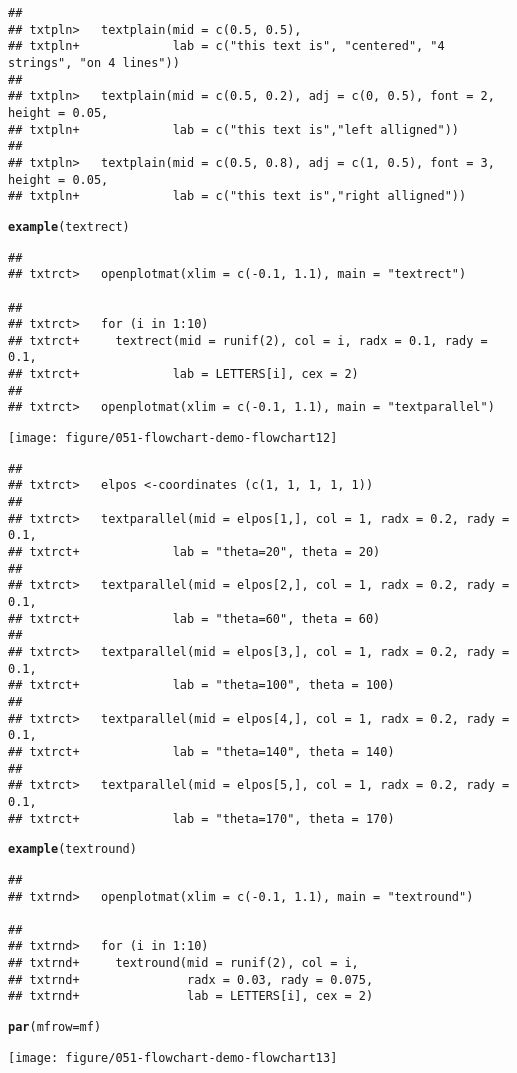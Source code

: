 \documentclass{article}\usepackage[]{graphicx}\usepackage[]{color}
\makeatletter
\def\maxwidth{ %
  \ifdim\Gin@nat@width>\linewidth
    \linewidth
  \else
    \Gin@nat@width
  \fi
}
\newcommand{\hlfunctioncall}[1]{\textcolor[rgb]{0.501960784313725,0,0.329411764705882}{\textbf{#1}}}%
\newenvironment{kframe}{%
 \def\at@end@of@kframe{}%
 \ifinner\ifhmode%
  \def\at@end@of@kframe{\end{minipage}}%
  \begin{minipage}{\columnwidth}%
 \fi\fi%
 \def\FrameCommand##1{\hskip\@totalleftmargin \hskip-\fboxsep
 \colorbox{shadecolor}{##1}\hskip-\fboxsep
     \hskip-\linewidth \hskip-\@totalleftmargin \hskip\columnwidth}%
 \MakeFramed {\advance\hsize-\width
   \@totalleftmargin\z@ \linewidth\hsize
   \@setminipage}}%
 {\par\unskip\endMakeFramed%
 \at@end@of@kframe}
\newenvironment{knitrout}{}{} %
\makeatother
\begin{document}
\begin{knitrout}
\begin{kframe}
\begin{verbatim}
## 
## txtpln>   textplain(mid = c(0.5, 0.5), 
## txtpln+             lab = c("this text is", "centered", "4 strings", "on 4 lines"))
## 
## txtpln>   textplain(mid = c(0.5, 0.2), adj = c(0, 0.5), font = 2, height = 0.05,
## txtpln+             lab = c("this text is","left alligned"))
## 
## txtpln>   textplain(mid = c(0.5, 0.8), adj = c(1, 0.5), font = 3, height = 0.05, 
## txtpln+             lab = c("this text is","right alligned"))
\end{verbatim}
\begin{alltt}
\hlfunctioncall{example}(textrect)
\end{alltt}
\begin{verbatim}
## 
## txtrct>   openplotmat(xlim = c(-0.1, 1.1), main = "textrect")

## 
## txtrct>   for (i in 1:10) 
## txtrct+     textrect(mid = runif(2), col = i, radx = 0.1, rady = 0.1,
## txtrct+             lab = LETTERS[i], cex = 2)
## 
## txtrct>   openplotmat(xlim = c(-0.1, 1.1), main = "textparallel")
\end{verbatim}
\end{kframe}
\texttt{[image: figure/051-flowchart-demo-flowchart12]} 
\begin{kframe}\begin{verbatim}
## 
## txtrct>   elpos <-coordinates (c(1, 1, 1, 1, 1))
## 
## txtrct>   textparallel(mid = elpos[1,], col = 1, radx = 0.2, rady = 0.1,
## txtrct+             lab = "theta=20", theta = 20)
## 
## txtrct>   textparallel(mid = elpos[2,], col = 1, radx = 0.2, rady = 0.1,
## txtrct+             lab = "theta=60", theta = 60)
## 
## txtrct>   textparallel(mid = elpos[3,], col = 1, radx = 0.2, rady = 0.1,
## txtrct+             lab = "theta=100", theta = 100)
## 
## txtrct>   textparallel(mid = elpos[4,], col = 1, radx = 0.2, rady = 0.1,
## txtrct+             lab = "theta=140", theta = 140)
## 
## txtrct>   textparallel(mid = elpos[5,], col = 1, radx = 0.2, rady = 0.1,
## txtrct+             lab = "theta=170", theta = 170)
\end{verbatim}
\begin{alltt}
\hlfunctioncall{example}(textround)
\end{alltt}
\begin{verbatim}
## 
## txtrnd>   openplotmat(xlim = c(-0.1, 1.1), main = "textround")

## 
## txtrnd>   for (i in 1:10) 
## txtrnd+     textround(mid = runif(2), col = i, 
## txtrnd+               radx = 0.03, rady = 0.075,
## txtrnd+               lab = LETTERS[i], cex = 2)
\end{verbatim}
\begin{alltt}


\hlfunctioncall{par}(mfrow = mf)
\end{alltt}
\end{kframe}
\texttt{[image: figure/051-flowchart-demo-flowchart13]} 

\end{knitrout}
\end{document}
